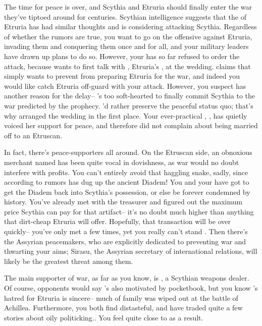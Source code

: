 \documentclass[char]{Kos}
\begin{document}
The time for peace is over, and Scythia and Etruria should finally enter the war they've tiptoed around for centuries. Scythian intelligence suggests that the \cEtruriaKing{\monarch} of Etruria has had similar thoughts and is considering attacking Scythia. Regardless of whether the rumors are true, you want to go on the offensive against Etruria, invading them and conquering them once and for all, and your military leaders have drawn up plans to do so. However, your \cScythiaKing{\spouse} has so far refused to order the attack, because \cScythiaKing{\they} wants to first talk with \cEtruriaKing{}, Etruria's \cEtruriaKing{\monarch}, at the wedding. \cScythiaKing{\They} claims that \cScythiaKing{\they} simply wants to prevent \cEtruriaKing{} from preparing Etruria for the war, and indeed you would like catch Etruria off-guard with your attack. However, you suspect \cScythiaKing{} has another reason for the delay-- \cScythiaKing{\they}'s too soft-hearted to finally commit Scythia to the war predicted by the prophecy. \cScythiaKing{\They}'d rather preserve the peaceful status quo; that's why \cScythiaKing{\they} arranged the wedding in the first place. Your ever-practical \cBride{\offspring}, \cBride{}, has quietly voiced her support for peace, and \cBride{\they} therefore did not complain about being married off to an Etruscan. 

In fact, there's peace-supporters all around. On the Etruscan side, an obnoxious merchant named \cMerchant{} has been quite vocal in \cMerchant{\their} dovishness, as war would no doubt interfere with \cMerchant{\their} profits. You can't entirely avoid that haggling snake, sadly, since according to rumors \cMerchant{\they} has dug up the ancient Diadem! You and your \cScythiaKing{\spouse} have got to get the Diadem back into Scythia's possession, or else be forever condemned by history. You've already met with the treasurer and figured out the maximum price Scythia can pay \cMerchant{} for that artifact-- it's no doubt much higher than anything that dirt-cheap Etruria will offer. Hopefully, that transaction will be over quickly-- you've only met \cMerchant{} a few times, yet you really can't stand \cMerchant{\them}. Then there's the Assyrian peacemakers, who are explicitly dedicated to preventing war and thwarting your aims; Sirasu, the Assyrian secretary of international relations, will likely be the greatest threat among them.

The main supporter of war, as far as you know, is \cArmsDealer{}, a Scythian weapons dealer. Of course, \cArmsDealer{\their} opponents would say \cArmsDealer{\they}'s also motivated by \cArmsDealer{\their} pocketbook, but you know \cArmsDealer{}'s hatred for Etruria is sincere-- much of \cArmsDealer{\their} family was wiped out at the battle of Achillea. Furthermore, you both find \cMerchant{} distasteful, and have traded quite a few stories about \cMerchant{\their} oily politicking.. You feel quite close to \cArmsDealer{} as a result. 
\end{document}
